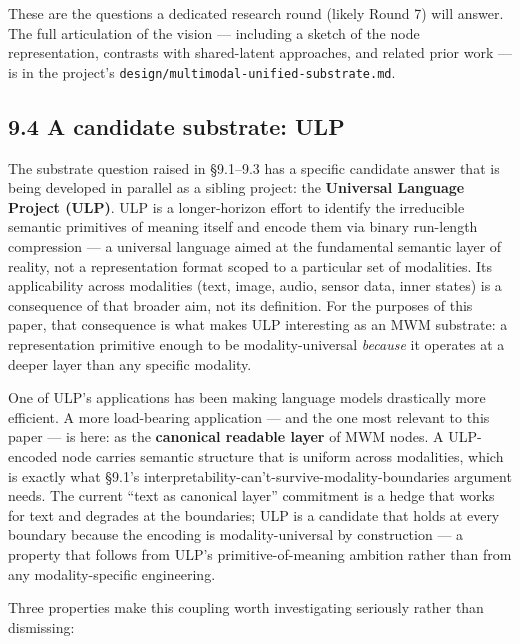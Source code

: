 \documentclass[12pt]{article}
\begin{document}
These are the questions a dedicated research round (likely Round 7) will answer. The full articulation of the vision --- including a sketch of the node representation, contrasts with shared-latent approaches, and related prior work --- is in the project's \texttt{design/multimodal-unified-substrate.md}.

\subsection{9.4 A candidate substrate: ULP}\label{a-candidate-substrate-ulp}

The substrate question raised in §9.1--9.3 has a specific candidate answer that is being developed in parallel as a sibling project: the \textbf{Universal Language Project (ULP)}. ULP is a longer-horizon effort to identify the irreducible semantic primitives of meaning itself and encode them via binary run-length compression --- a universal language aimed at the fundamental semantic layer of reality, not a representation format scoped to a particular set of modalities. Its applicability across modalities (text, image, audio, sensor data, inner states) is a consequence of that broader aim, not its definition. For the purposes of this paper, that consequence is what makes ULP interesting as an MWM substrate: a representation primitive enough to be modality-universal \emph{because} it operates at a deeper layer than any specific modality.

One of ULP's applications has been making language models drastically more efficient. A more load-bearing application --- and the one most relevant to this paper --- is here: as the \textbf{canonical readable layer} of MWM nodes. A ULP-encoded node carries semantic structure that is uniform across modalities, which is exactly what §9.1's interpretability-can't-survive-modality-boundaries argument needs. The current ``text as canonical layer'' commitment is a hedge that works for text and degrades at the boundaries; ULP is a candidate that holds at every boundary because the encoding is modality-universal by construction --- a property that follows from ULP's primitive-of-meaning ambition rather than from any modality-specific engineering.

Three properties make this coupling worth investigating seriously rather than dismissing:
\end{document}
